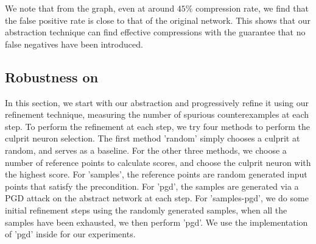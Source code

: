 We note that from the graph, even at around $45\%$ compression rate,
we find that the false positive rate is close to that of the original network.
This shows that our abstraction technique can find effective compressions with
the guarantee that no false negatives have been introduced. 

\subsection{Robustness on \mnist}
\label{s:exp-mnist-rob}

In this section, we start with our abstraction and progressively refine it using
our refinement technique, measuring the number of spurious counterexamples at
each step. To perform the refinement at each step, we try four methods to
perform the culprit neuron selection. The first method 'random' simply chooses a
culprit at random, and serves as a baseline. For the other three methods, we
choose a number of reference points to calculate scores, and choose the culprit
neuron with the highest score. For 'samples', the reference points are random
generated input points that satisfy the precondition. For 'pgd', the samples are
generated via a PGD \cite{pgd, pgd-attack} attack on the abstract network at each step. For
'samples-pgd', we do some initial refinement steps using the randomly generated
samples, when all the samples have been exhausted, we then perform 'pgd'. We use
the implementation of 'pgd' inside \abcrown for our experiments.

